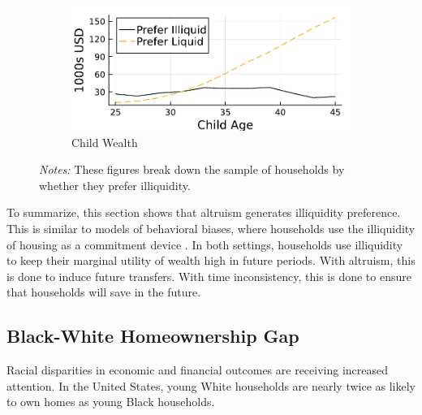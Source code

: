\documentclass[12pt]{article}
\begin{document}
\begin{figure}[tb]
\begin{subfigure}{0.5\textwidth}
	\end{subfigure}%
	\hfill
	\begin{subfigure}{0.5\textwidth}%
		\caption{Child Wealth}\label{fig:pref_wealthk}%
		\includegraphics[width=\textwidth]{../tabfig/preferliq/prefer_wealthk.pdf}%
	\end{subfigure}%
	\caption*{\footnotesize \textit{Notes:} These figures break down the sample of households by whether they prefer illiquidity.}
\end{figure}

To summarize, this section shows that altruism generates illiquidity preference. This is similar to models of behavioral biases, where households use the illiquidity of housing as a commitment device \cite{attanasio2024temptation}. In both settings, households use illiquidity to keep their marginal utility of wealth high in future periods. With altruism, this is done to induce future transfers. With time inconsistency, this is done to ensure that households will save in the future.

\subsection{Black-White Homeownership Gap}
Racial disparities in economic and financial outcomes are receiving increased attention. In the United States, young White households are nearly twice as likely to own homes as young Black households.
\end{document}
